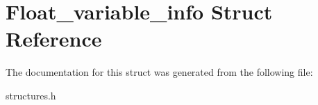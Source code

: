 \hypertarget{structFloat__variable__info}{}\section{Float\+\_\+variable\+\_\+info Struct Reference}
\label{structFloat__variable__info}


The documentation for this struct was generated from the following file\+:\begin{DoxyCompactItemize}
\item 
structures.\+h\end{DoxyCompactItemize}
